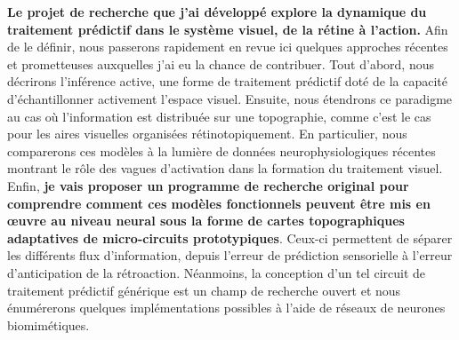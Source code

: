 \textbf{Le projet de recherche que j'ai développé
explore la dynamique du traitement prédictif dans le système visuel,
de la rétine à l'action.}
Afin de le définir, nous passerons rapidement en revue ici quelques approches récentes et
prometteuses auxquelles j'ai eu la chance de contribuer. Tout d'abord, nous décrirons l'inférence active, une forme
de traitement prédictif doté de la capacité d'échantillonner activement
l'espace visuel. Ensuite, nous étendrons ce paradigme au cas où
l'information est distribuée sur une topographie, comme c'est le cas
pour les aires visuelles organisées rétinotopiquement. En particulier,
nous comparerons ces modèles à la lumière de données neurophysiologiques
récentes montrant le rôle des vagues d'activation dans la formation du
traitement visuel. Enfin, \textbf{je vais proposer un programme de recherche original
pour comprendre comment ces modèles fonctionnels peuvent être mis en
œuvre au niveau neural sous la forme de cartes topographiques adaptatives de micro-circuits
prototypiques}. Ceux-ci permettent de séparer les différents flux
d'information, depuis l'erreur de prédiction sensorielle à l'erreur d'anticipation de la rétroaction.
Néanmoins, la conception d'un tel
circuit de traitement prédictif générique est un champ de recherche ouvert et nous énumérerons quelques implémentations possibles à l'aide
de réseaux de neurones biomimétiques.

